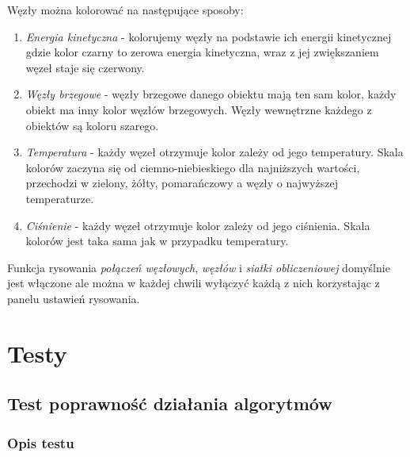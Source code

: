 \documentclass[12pt, letterpaper]{report}
\begin{document}
    Węzły można kolorować na następujące sposoby:
    \begin{enumerate}
        \item \emph{Energia kinetyczna} - kolorujemy węzły na podstawie ich energii kinetycznej 
        gdzie kolor czarny to zerowa energia kinetyczna, wraz z jej zwiększaniem węzeł staje się czerwony.

        \item \emph{Węzły brzegowe} - węzły brzegowe danego obiektu mają ten sam kolor,
        każdy obiekt ma inny kolor węzłów brzegowych. Węzły wewnętrzne każdego z obiektów są koloru szarego.

        \item \emph{Temperatura} - każdy węzeł otrzymuje kolor zależy od jego temperatury. 
        Skala kolorów zaczyna się od ciemno-niebieskiego dla najniższych wartości, 
        przechodzi w zielony, żółty, pomarańczowy a węzły o najwyższej temperaturze.

        \item \emph{Ciśnienie} - każdy węzeł otrzymuje kolor zależy od jego ciśnienia. 
        Skala kolorów jest taka sama jak w przypadku temperatury.
    \end{enumerate}

    Funkcja rysowania \emph{połączeń węzłowych}, \emph{węzłów} i \emph{siatki obliczeniowej} domyślnie 
    jest włączone ale można w każdej chwili wyłączyć każdą z nich korzystając z panelu ustawień rysowania.

\chapter{Testy}
    \section{Test poprawność działania algorytmów}
    \subsection{Opis testu}
    
\end{document}
